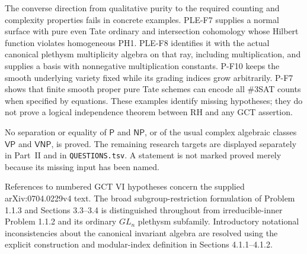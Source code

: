 The converse direction from qualitative purity to the required counting
and complexity properties fails in concrete examples. PLE-F7 supplies a
normal surface with pure even Tate ordinary and intersection cohomology
whose Hilbert function violates homogeneous PH1. PLE-F8 identifies it
with the actual canonical plethysm multiplicity algebra on that ray,
including multiplication, and supplies a basis with nonnegative
multiplication constants. P-F10 keeps the smooth
underlying variety fixed while its grading indices grow arbitrarily.
P-F7 shows that finite smooth proper pure Tate schemes can encode all
\#3SAT counts when specified by equations. These examples identify
missing hypotheses; they do not prove a logical independence theorem
between RH and any GCT assertion.

No separation or equality of $\mathsf P$ and $\mathsf{NP}$, or of the
usual complex algebraic classes $\mathsf{VP}$ and $\mathsf{VNP}$, is
proved. The remaining research targets are displayed separately in
Part~II and in \texttt{QUESTIONS.tsv}. A statement is not marked proved
merely because its missing input has been named.

References to numbered GCT VI hypotheses concern the supplied
arXiv:0704.0229v4 text. The broad subgroup-restriction formulation
of Problem 1.1.3 and Sections 3.3--3.4 is distinguished throughout
from irreducible-inner Problem 1.1.2 and its ordinary $GL_n$
plethysm subfamily. Introductory notational inconsistencies about
the canonical invariant algebra are resolved using the explicit
construction and modular-index definition in Sections 4.1.1--4.1.2.

